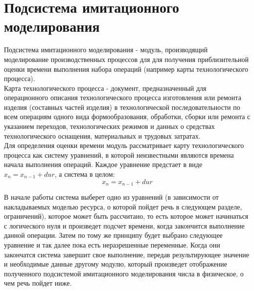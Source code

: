 \section{Подсистема имитационного моделирования}
\indent Подсистема имитационного моделирования - модуль, производящий моделирование производственных процессов для для получения приблизительной оценки времени выполнения набора операций (например карты технологического процесса).\\
\indent Карта технологического процесса - документ, предназначенный для операционного описания технологического процесса изготовления или ремонта изделия (составных частей изделия) в технологической последовательности по всем операциям одного вида формообразования, обработки, сборки или ремонта с указанием переходов, технологических режимов и данных о средствах технологического оснащения, материальных и трудовых затратах.\\
\indent Для определения оценки времени модуль рассматривает карту технологического процесса как систему уравнений, в которой неизвестными являются времена начала выполнения операций.
Каждое уравнение предстает в виде $x_n = x_{n-1} + dur$, а система в целом:
\begin{equation}
	x_n = x_{n-1} + dur
\end{equation}

\indent В начале работы система выберет одно из уравнений (в зависимости от накладываемых моделью ресурса, о которой пойдет речь в следующем разделе, ограничений), которое может быть рассчитано, то есть которое может начинаться с логического нуля и произведет подсчет времени, когда закончится выполнение данной операции.
Затем по тому же принципу будет выбрано следующее уравнение и так далее пока есть неразрешенные переменные.
Когда они закончатся система завершит свое выполнение, передав результирующее значение и необходимые данные другому модулю, который произведет отображение полученного подсистемой имитационного моделирования числа в физическое, о чем речь пойдет ниже.

